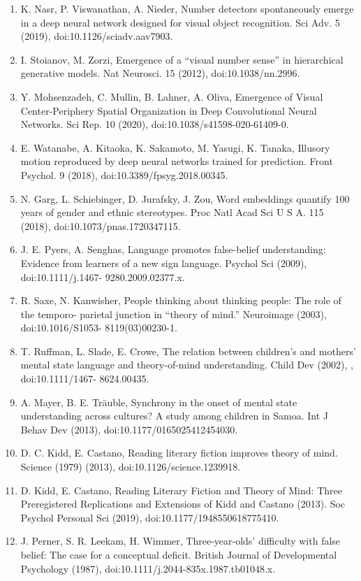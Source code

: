 \documentclass[11pt]{article}
\begin{document}
\begin{enumerate}
\item K. Nasr, P. Viswanathan, A. Nieder, Number detectors spontaneously emerge in a deep neural network designed for visual object recognition. Sci Adv. 5 (2019), doi:10.1126/sciadv.aav7903.
\item I. Stoianov, M. Zorzi, Emergence of a “visual number sense” in hierarchical generative models. Nat Neurosci. 15 (2012), doi:10.1038/nn.2996.
\item Y. Mohsenzadeh, C. Mullin, B. Lahner, A. Oliva, Emergence of Visual Center-Periphery Spatial Organization in Deep Convolutional Neural Networks. Sci Rep. 10 (2020), doi:10.1038/s41598-020-61409-0.
\item E. Watanabe, A. Kitaoka, K. Sakamoto, M. Yasugi, K. Tanaka, Illusory motion reproduced by deep neural networks trained for prediction. Front Psychol. 9 (2018), doi:10.3389/fpsyg.2018.00345.
\item N. Garg, L. Schiebinger, D. Jurafsky, J. Zou, Word embeddings quantify 100 years of gender and ethnic stereotypes. Proc Natl Acad Sci U S A. 115 (2018), doi:10.1073/pnas.1720347115.
\item J. E. Pyers, A. Senghas, Language promotes false-belief understanding: Evidence from learners of a new sign language. Psychol Sci (2009), doi:10.1111/j.1467- 9280.2009.02377.x.
\item R. Saxe, N. Kanwisher, People thinking about thinking people: The role of the temporo- parietal junction in “theory of mind.” Neuroimage (2003), doi:10.1016/S1053- 8119(03)00230-1.
\item T. Ruffman, L. Slade, E. Crowe, The relation between children’s and mothers’ mental state language and theory-of-mind understanding. Child Dev (2002), , doi:10.1111/1467- 8624.00435.
\item A. Mayer, B. E. Träuble, Synchrony in the onset of mental state understanding across cultures? A study among children in Samoa. Int J Behav Dev (2013), doi:10.1177/0165025412454030.
\item D. C. Kidd, E. Castano, Reading literary fiction improves theory of mind. Science (1979) (2013), doi:10.1126/science.1239918.
\item D. Kidd, E. Castano, Reading Literary Fiction and Theory of Mind: Three Preregistered Replications and Extensions of Kidd and Castano (2013). Soc Psychol Personal Sci (2019), doi:10.1177/1948550618775410.
\item J. Perner, S. R. Leekam, H. Wimmer, Three-year-olds’ difficulty with false belief: The case for a conceptual deficit. British Journal of Developmental Psychology (1987), doi:10.1111/j.2044-835x.1987.tb01048.x.


\end{enumerate}
\end{document}
